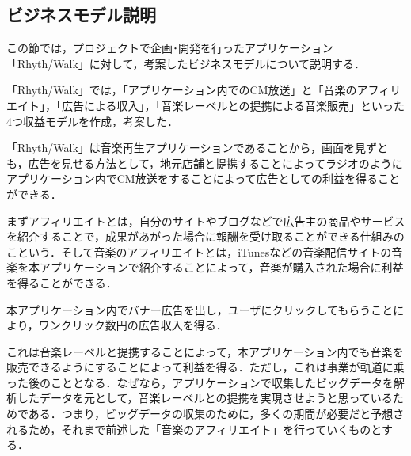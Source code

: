 \subsection{ビジネスモデル説明}
\par
\begin{itemize}
この節では，プロジェクトで企画･開発を行ったアプリケーション「Rhyth/Walk」に対して，考案したビジネスモデルについて説明する．
\par
「Rhyth/Walk」では，「アプリケーション内でのCM放送」と「音楽のアフィリエイト」，「広告による収入」，「音楽レーベルとの提携による音楽販売」といった4つ収益モデルを作成，考案した．
\par
{}
「Rhyth/Walk」は音楽再生アプリケーションであることから，画面を見ずとも，広告を見せる方法として，地元店舗と提携することによってラジオのようにアプリケーション内でCM放送をすることによって広告としての利益を得ることができる．
\par
{}
まずアフィリエイトとは，自分のサイトやブログなどで広告主の商品やサービスを紹介することで，成果があがった場合に報酬を受け取ることができる仕組みのこという．そして音楽のアフィリエイトとは，iTunesなどの音楽配信サイトの音楽を本アプリケーションで紹介することによって，音楽が購入された場合に利益を得ることができる．
\par
{}
本アプリケーション内でバナー広告を出し，ユーザにクリックしてもらうことにより，ワンクリック数円の広告収入を得る．
\par
{}
これは音楽レーベルと提携することによって，本アプリケーション内でも音楽を販売できるようにすることによって利益を得る．ただし，これは事業が軌道に乗った後のこととなる．なぜなら，アプリケーションで収集したビッグデータを解析したデータを元として，音楽レーベルとの提携を実現させようと思っているためである．つまり，ビッグデータの収集のために，多くの期間が必要だと予想されるため，それまで前述した「音楽のアフィリエイト」を行っていくものとする．
\end{itemize}
